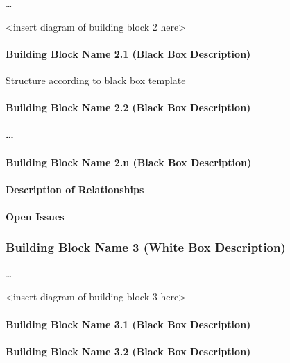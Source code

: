 \documentclass[]{article}
\begin{document}
\ldots{}

\textless{}insert diagram of building block 2 here\textgreater{}

\paragraph{Building Block Name 2.1 (Black Box Description)}

Structure according to black box template

\paragraph{Building Block Name 2.2 (Black Box Description)}

\paragraph{\ldots{}}

\paragraph{Building Block Name 2.n (Black Box Description)}

\paragraph{Description of Relationships}

\paragraph{Open Issues}

\subsubsection{Building Block Name 3 (White Box Description)}

\ldots{}

\textless{}insert diagram of building block 3 here\textgreater{}

\paragraph{Building Block Name 3.1 (Black Box Description)}

\paragraph{Building Block Name 3.2 (Black Box Description)}
\end{document}
